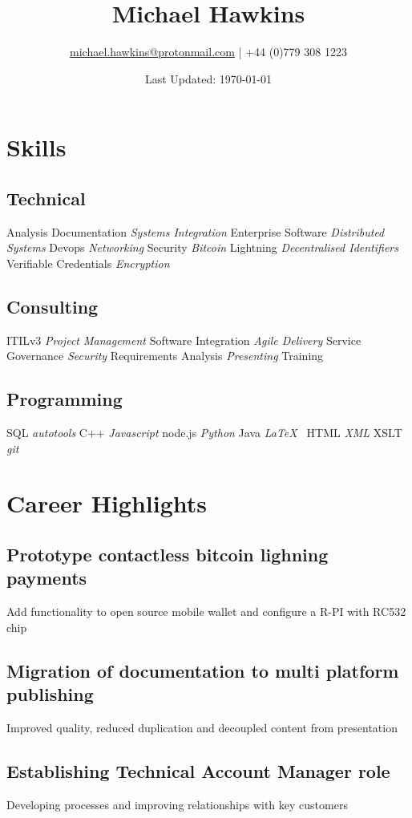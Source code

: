 \documentclass[]{article}
\title{Michael Hawkins}
\author{\href{mailto:michael.hawkins@protonmail.com}{michael.hawkins@protonmail.com} | +44 (0)779 308 1223}
\date{Last Updated: \today}
\begin{document}
%
\maketitle
%
%
\begin{minipage}[t]{0.30\textwidth}
%
%
%
\section{Skills}
%
	\subsection{Technical}
	Analysis Documentation
	\textit{Systems Integration}
	Enterprise Software
	\textit{Distributed Systems}
	Devops
	\textit{Networking}
	Security
	\textit{Bitcoin}
	Lightning
	\textit{Decentralised Identifiers}
	Verifiable Credentials
	\textit{Encryption}
	\subsection{Consulting}
	ITILv3
	\textit{Project Management}
	Software Integration
	\textit{Agile Delivery}
	Service Governance
	\textit{Security}
	Requirements Analysis
	\textit{Presenting}
	Training
	\subsection{Programming}
	SQL
    \textit{autotools}
    C++
	\textit{Javascript}
	node.js
	\textit{Python}
	Java
	\textit{\LaTeX\ } 
	HTML
	\textit{XML}
	XSLT
	\textit{git}

%
%
\section{Career Highlights}
%
	\subsection{Prototype contactless bitcoin lighning payments}
	Add functionality to open source mobile wallet and configure a R-PI with RC532 chip 
	\subsection{Migration of documentation to multi platform publishing}
	Improved quality, reduced duplication and decoupled content from presentation
	\subsection{Establishing Technical Account Manager role}
	Developing processes and improving relationships with key customers

\end{minipage}
\end{document}

